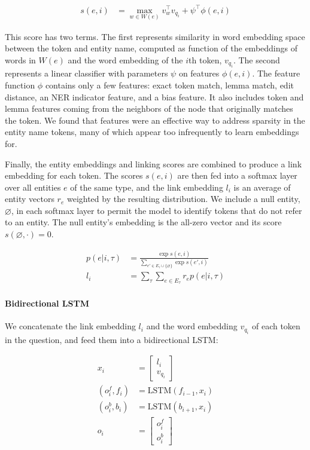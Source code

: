 \begin{align}
s(e,i) & = \max_{w \in W(e)} v_w^\intercal v_{q_i} + \psi^\intercal \phi(e,i)
\end{align}

This score has two terms. The first represents similarity in word embedding 
space between the token and entity name, computed as function of the embeddings 
of words in $W(e)$ and the word embedding of the $i$th token, $v_{q_i}$. The 
second represents a linear classifier with parameters $\psi$ on features 
$\phi(e,i)$.
The feature function $\phi$ contains only a few features: exact token match, 
lemma match, edit distance, an NER indicator feature, and a bias feature.
It also includes token and lemma features coming from the neighbors of the node
that originally matches the token. We found that features were an effective way
to address sparsity in the entity name tokens, many of which appear too 
infrequently
to learn embeddings for.

Finally, the entity embeddings and linking scores are combined to produce a 
link embedding for each token.
The scores $s(e,i)$ are then fed into a softmax layer over all entities $e$ of 
the same type, and the link embedding $l_{i}$ is an average of entity vectors 
$r_e$ weighted by the resulting distribution.
We include a null entity, $\varnothing$, in each softmax layer to permit the 
model to identify tokens that do not refer to an entity. The null entity's 
embedding is the all-zero vector and its score $s(\varnothing, \cdot) = 0$.

\begin{align}
p(e | i, \tau) & = \frac{\exp{s(e,i)}}{\sum_{e'\in E_\tau \cup \{\varnothing\}} 
\exp{s(e',i)}} \\
l_{i} & = \sum_\tau \sum_{e \in E_\tau} r_e p(e | i, \tau)
\end{align}

\paragraph{Bidirectional LSTM}
We concatenate the link embedding $l_i$ and the word embedding $v_{q_i}$ of 
each token in the question, and feed them into a bidirectional LSTM:

\begin{align}
x_i &= \begin{bmatrix} l_{i} \\ v_{q_i} \end{bmatrix} \\
(o^f_i, f_i) &= \text{LSTM}(f_{i-1}, x_i) \\
(o^b_i, b_i) &= \text{LSTM}(b_{i+1}, x_i) \\
o_i &= \begin{bmatrix} o^f_i \\  o^b_i \end{bmatrix}
\end{align}

